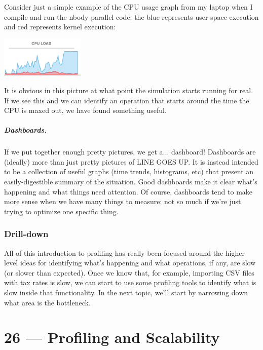 \documentclass[a4paper]{report}
\begin{document}
Consider just a simple example of the CPU usage graph from my laptop when I compile and run the nbody-parallel code; the blue represents user-space execution and red represents kernel execution:

\begin{center}
	\includegraphics[width=0.3\textwidth]{images/cpu-load.png}
\end{center}

It is obvious in this picture at what point the simulation starts running for real. If we see this and we can identify an operation that starts around the time the CPU is maxed out, we have found something useful.

\paragraph{Dashboards.} If we put together enough pretty pictures, we get a... dashboard! Dashboards are (ideally) more than just pretty pictures of LINE GOES UP. It is instead intended to be a collection of useful graphs (time trends, histograms, etc) that present an easily-digestible summary of the situation. Good dashboards make it clear what's happening and what things need attention. Of course, dashboards tend to make more sense when we have many things to measure; not so much if we're just trying to optimize one specific thing.

\subsection*{Drill-down}
All of this introduction to profiling has really been focused around the higher level ideas for identifying what's happening and what operations, if any, are slow (or slower than expected). Once we know that, for example, importing CSV files with tax rates is slow, we can start to use some profiling tools to identify what is slow inside that functionality.  In the next topic, we'll start by narrowing down what area is the bottleneck. 










\chapter*{26 --- Profiling and Scalability}
\end{document}
